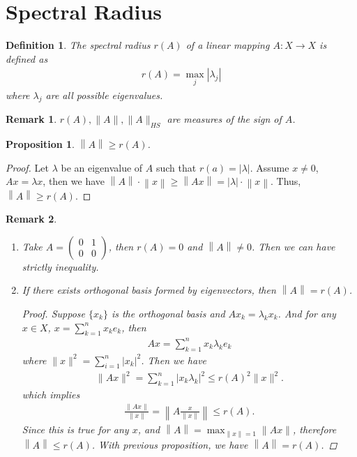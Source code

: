 \documentclass[10pt]{book}
\newtheorem{definition}{Definition}[chapter]
\newtheorem{proposition}{Proposition}[chapter]
\newtheorem{remark}{Remark}[chapter]
\theoremstyle{definition}
\numberwithin{equation}{chapter}
\begin{document}
\medskip

\section{Spectral Radius}

\begin{definition}
The spectral radius $r(A)$ of a linear mapping $A:X\to X$ is defined as
\begin{align*}
    r(A) = \max_{j} \left|\lambda_j \right|
\end{align*}
where $\lambda_j$ are all possible eigenvalues.
\end{definition}

\begin{remark}
$r(A), \|A\|, \|A\|_{HS}$ are measures of the sign of $A$.
\end{remark}

\medskip

\begin{proposition}
$\left\|A\right\| \geq r(A)$.
\end{proposition}
\begin{proof}
Let $\lambda$ be an eigenvalue of $A$ such that $r(a) = \left|\lambda\right|$. Assume $x\neq 0$, $Ax = \lambda x$, then we have $\left\|A\right\|\cdot \left\|x\right\| \geq \left\|Ax\right\| = |\lambda|\cdot \left\|x\right\|$. Thus, $\left\|A\right\| \geq r(A)$.
\end{proof}

\medskip

\begin{remark}\label{remark_792}
~\begin{enumerate}[label=(\alph*)]
    \item Take $A = \begin{pmatrix}
    0 & 1  \\
    0 & 0  
    \end{pmatrix}$, then $r(A) = 0$ and $\left\|A\right\| \neq 0$. Then we can have strictly inequality.
    \item If there exists orthogonal basis formed by eigenvectors, then $\left\|A\right\| = r(A)$.
    \begin{proof}
    Suppose $\{x_k\}$ is the orthogonal basis and $Ax_k = \lambda_k x_k$. And for any $x\in X$, $x = \sum^n_{k=1}x_k e_k$, then 
    \begin{align*}
        Ax = \sum^n_{k=1} x_k \lambda_k e_k
    \end{align*}
    where $\|x\|^2 = \sum^n_{i=1}|x_k|^2$. Then we have 
    \begin{align*}
        \|Ax\|^2 = \sum^n_{k=1} |x_k \lambda_k|^2 \leq r(A)^2 \|x\|^2. 
    \end{align*} 
    which implies 
    \begin{align*}
        \frac{\|Ax\|}{\|x\|} = \left\|A \frac{x}{\|x\|}\right\| \leq r(A).
    \end{align*}
    Since this is true for any $x$, and $\left\|A\right\| = \max_{\|x\|=1}\|Ax\|$, therefore $\left\|A\right\| \leq r(A)$. With previous proposition, we have $\left\|A\right\| = r(A)$.
    \end{proof}
\end{enumerate}
\end{remark}
\end{document}
